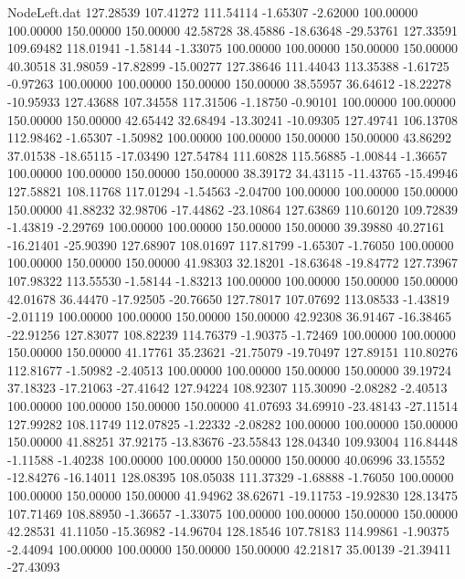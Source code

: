 \begin{filecontents}{NodeLeft.dat}
 127.28539  107.41272  111.54114    -1.65307   -2.62000  100.00000  100.00000  150.00000  150.00000   42.58728   38.45886  -18.63648  -29.53761
 127.33591  109.69482  118.01941    -1.58144   -1.33075  100.00000  100.00000  150.00000  150.00000   40.30518   31.98059  -17.82899  -15.00277
 127.38646  111.44043  113.35388    -1.61725   -0.97263  100.00000  100.00000  150.00000  150.00000   38.55957   36.64612  -18.22278  -10.95933
 127.43688  107.34558  117.31506    -1.18750   -0.90101  100.00000  100.00000  150.00000  150.00000   42.65442   32.68494  -13.30241  -10.09305
 127.49741  106.13708  112.98462    -1.65307   -1.50982  100.00000  100.00000  150.00000  150.00000   43.86292   37.01538  -18.65115  -17.03490
 127.54784  111.60828  115.56885    -1.00844   -1.36657  100.00000  100.00000  150.00000  150.00000   38.39172   34.43115  -11.43765  -15.49946
 127.58821  108.11768  117.01294    -1.54563   -2.04700  100.00000  100.00000  150.00000  150.00000   41.88232   32.98706  -17.44862  -23.10864
 127.63869  110.60120  109.72839    -1.43819   -2.29769  100.00000  100.00000  150.00000  150.00000   39.39880   40.27161  -16.21401  -25.90390
 127.68907  108.01697  117.81799    -1.65307   -1.76050  100.00000  100.00000  150.00000  150.00000   41.98303   32.18201  -18.63648  -19.84772
 127.73967  107.98322  113.55530    -1.58144   -1.83213  100.00000  100.00000  150.00000  150.00000   42.01678   36.44470  -17.92505  -20.76650
 127.78017  107.07692  113.08533    -1.43819   -2.01119  100.00000  100.00000  150.00000  150.00000   42.92308   36.91467  -16.38465  -22.91256
 127.83077  108.82239  114.76379    -1.90375   -1.72469  100.00000  100.00000  150.00000  150.00000   41.17761   35.23621  -21.75079  -19.70497
 127.89151  110.80276  112.81677    -1.50982   -2.40513  100.00000  100.00000  150.00000  150.00000   39.19724   37.18323  -17.21063  -27.41642
 127.94224  108.92307  115.30090    -2.08282   -2.40513  100.00000  100.00000  150.00000  150.00000   41.07693   34.69910  -23.48143  -27.11514
 127.99282  108.11749  112.07825    -1.22332   -2.08282  100.00000  100.00000  150.00000  150.00000   41.88251   37.92175  -13.83676  -23.55843
 128.04340  109.93004  116.84448    -1.11588   -1.40238  100.00000  100.00000  150.00000  150.00000   40.06996   33.15552  -12.84276  -16.14011
 128.08395  108.05038  111.37329    -1.68888   -1.76050  100.00000  100.00000  150.00000  150.00000   41.94962   38.62671  -19.11753  -19.92830
 128.13475  107.71469  108.88950    -1.36657   -1.33075  100.00000  100.00000  150.00000  150.00000   42.28531   41.11050  -15.36982  -14.96704
 128.18546  107.78183  114.99861    -1.90375   -2.44094  100.00000  100.00000  150.00000  150.00000   42.21817   35.00139  -21.39411  -27.43093

\end{filecontents}
